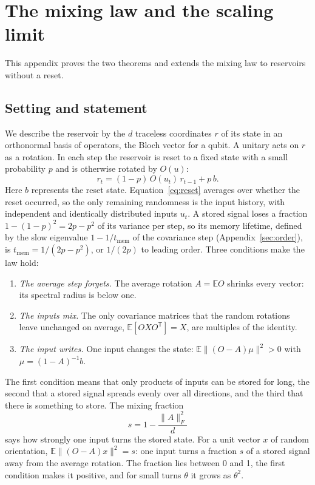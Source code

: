 \section{The mixing law and the scaling limit}
\label{app:law}
This appendix proves the two theorems and extends the mixing law to reservoirs without a reset.

\subsection{Setting and statement}
We describe the reservoir by the $d$ traceless coordinates $r$ of its state in an orthonormal basis of operators, the
Bloch vector for a qubit. A unitary acts on $r$ as a rotation. In each step the reservoir is reset to a fixed state
with a small probability $p$ and is otherwise rotated by $O(u)$:
\begin{equation}
  r_t=(1-p)\,O(u_t)\,r_{t-1}+p\,b .
  \label{eq:reset}
\end{equation}
Here $b$ represents the reset state. Equation~\eqref{eq:reset} averages over whether the reset occurred, so the only
remaining randomness is the input history, with independent and identically distributed inputs $u_t$. A stored signal loses a fraction $1-(1-p)^2=2p-p^2$ of its variance per step, so its memory lifetime, defined by
the slow eigenvalue $1-1/t_{\mathrm{mem}}$ of the covariance step (Appendix~\ref{sec:order}), is
$t_{\mathrm{mem}}=1/(2p-p^2)$, or $1/(2p)$ to leading order. Three
conditions make the law hold:
\begin{enumerate}[label=(\arabic*),leftmargin=*,itemsep=2pt,topsep=4pt]
\item \emph{The average step forgets.} The average rotation $A=\mathbb EO$ shrinks every vector: its spectral radius
  is below one.
\item \emph{The inputs mix.} The only covariance matrices that the random rotations leave unchanged on average,
  $\mathbb E[OXO^{\mathsf T}]=X$, are multiples of the identity.
\item \emph{The input writes.} One input changes the state: $\mathbb E\|(O-A)\mu\|^2>0$ with $\mu=(1-A)^{-1}b$.
\end{enumerate}
The first condition means that only products of inputs can be stored for long, the second that a stored signal
spreads evenly over all directions, and the third that there is something to store. The mixing fraction
\begin{equation}
  s=1-\frac{\|A\|_F^2}{d}
  \label{eq:mixing}
\end{equation}
says how strongly one input turns the stored state. For a unit vector $x$ of random orientation,
$\mathbb E\|(O-A)x\|^2=s$: one input turns a fraction $s$ of a stored signal away from the average rotation. The
fraction lies between 0 and 1, the first condition makes it positive, and for small turns $\theta$ it grows as
$\theta^2$.

